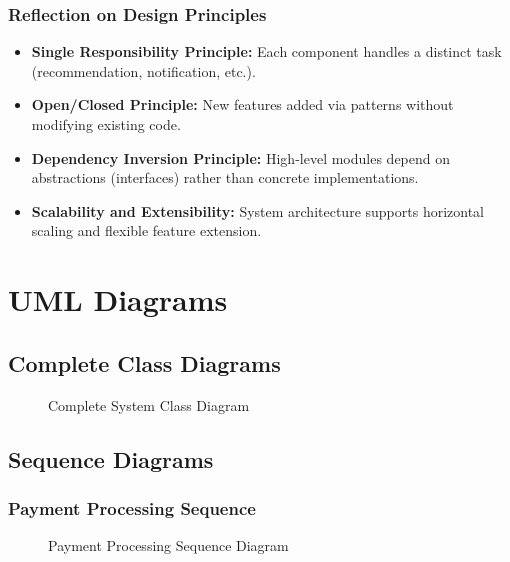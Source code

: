 \documentclass[a4paper,12pt]{report}
\begin{document}
\subsection*{Reflection on Design Principles}
\begin{itemize}[leftmargin=*]
    \item \textbf{Single Responsibility Principle:} Each component handles a distinct task (recommendation, notification, etc.).
    \item \textbf{Open/Closed Principle:} New features added via patterns without modifying existing code.
    \item \textbf{Dependency Inversion Principle:} High-level modules depend on abstractions (interfaces) rather than concrete implementations.
    \item \textbf{Scalability and Extensibility:} System architecture supports horizontal scaling and flexible feature extension.
\end{itemize}



\appendix

\chapter{UML Diagrams}

\section{Complete Class Diagrams}

\begin{figure}[h]
    \centering
    \caption{Complete System Class Diagram}
\end{figure}

\section{Sequence Diagrams}

\subsection{Payment Processing Sequence}
\begin{figure}[h]
    \centering
    \caption{Payment Processing Sequence Diagram}
\end{figure}
\end{document}
